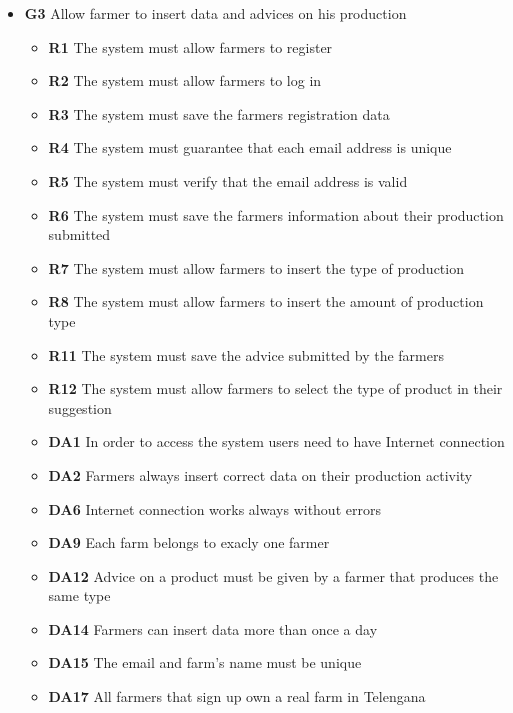 \begin{itemize}
    \item \textbf{G3} Allow farmer to insert data and advices on his production
        \begin{itemize}
        \renewcommand\labelitemi{--}
        \item \textbf{R1} The system must allow farmers to register
        \item \textbf{R2} The system must allow farmers to log in
        \item \textbf{R3} The system must save the farmers registration data
        \item \textbf{R4} The system must guarantee that each email address is unique
        \item \textbf{R5} The system must verify that the email address is valid
        \item \textbf{R6} The system must save the farmers information about their production submitted
        \item \textbf{R7} The system must allow farmers to insert the type of production
        \item \textbf{R8} The system must allow farmers to insert the amount of production type
        \item \textbf{R11} The system must save the advice submitted by the farmers
        \item \textbf{R12} The system must allow farmers to select the type of product in their suggestion
        \item \textbf{DA1} In order to access the system users need to have Internet connection
        \item \textbf{DA2} Farmers always insert correct data on their production activity
        \item \textbf{DA6} Internet connection works always without errors
        \item \textbf{DA9} Each farm belongs to exacly one farmer
        \item \textbf{DA12} Advice on a product must be given by a farmer that produces the same type
        \item \textbf{DA14} Farmers can insert data more than once a day
        \item \textbf{DA15} The email and farm's name must be unique
        \item \textbf{DA17} All farmers that sign up own a real farm in Telengana
        \end{itemize} 
    

\end{itemize}

